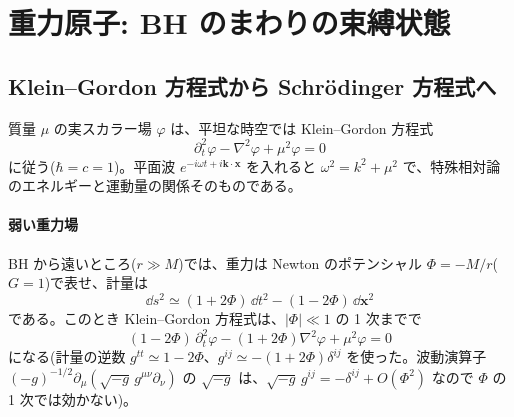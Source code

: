 \section{重力原子: BH のまわりの束縛状態}\label{sec:atom}

\subsection{Klein--Gordon 方程式から Schr\"odinger 方程式へ}

質量 $\mu$ の実スカラー場 $\varphi$ は、平坦な時空では Klein--Gordon 方程式
\begin{equation}
\partial_t^2\varphi-\nabla^2\varphi+\mu^2\varphi=0
\label{eq:KG}
\end{equation}
に従う($\hbar=c=1$)。平面波 $e^{-i\omega t+i\bm k\cdot\bm x}$ を入れると $\omega^2=k^2+\mu^2$ で、特殊相対論のエネルギーと運動量の関係そのものである。

\paragraph{弱い重力場}
BH から遠いところ($r\gg M$)では、重力は Newton のポテンシャル $\Phi=-M/r$($G=1$)で表せ、計量は
\begin{equation}
\dd s^2\simeq(1+2\Phi)\,\dd t^2-(1-2\Phi)\,\dd\bm x^2
\end{equation}
である。このとき Klein--Gordon 方程式は、$|\Phi|\ll1$ の 1 次までで
\begin{equation}
(1-2\Phi)\,\partial_t^2\varphi-(1+2\Phi)\nabla^2\varphi+\mu^2\varphi=0
\label{eq:KG_weak}
\end{equation}
になる(計量の逆数 $g^{tt}\simeq1-2\Phi$、$g^{ij}\simeq-(1+2\Phi)\delta^{ij}$ を使った。波動演算子 $(-g)^{-1/2}\partial_\mu(\sqrt{-g}\,g^{\mu\nu}\partial_\nu)$ の $\sqrt{-g}$ は、$\sqrt{-g}\,g^{ij}=-\delta^{ij}+O(\Phi^2)$ なので $\Phi$ の 1 次では効かない)。

